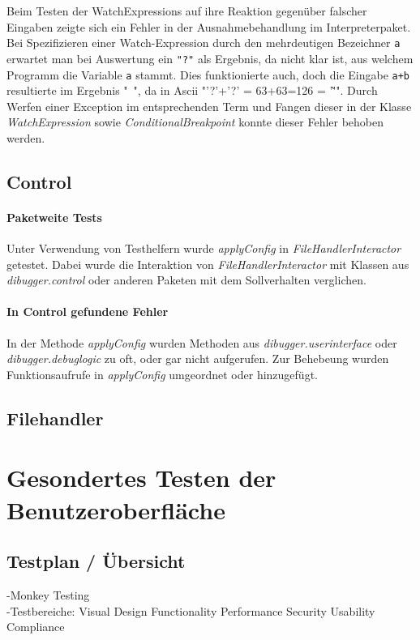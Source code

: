 \documentclass[parskip=full]{scrartcl}
\begin{document}
Beim Testen der WatchExpressions auf ihre Reaktion gegenüber falscher Eingaben zeigte sich ein Fehler in der Ausnahmebehandlung im Interpreterpaket. Bei Spezifizieren einer Watch-Expression durch den mehrdeutigen Bezeichner \texttt{a} erwartet man bei Auswertung ein \texttt{"?"} als Ergebnis, da nicht klar ist, aus welchem Programm die Variable \texttt{a} stammt. Dies funktionierte auch, doch die Eingabe \texttt{a+b} resultierte im Ergebnis "~", da in Ascii "'?'+'?' = 63+63=126 = '\~'".
Durch Werfen einer Exception im entsprechenden Term und Fangen dieser in der Klasse \textit{WatchExpression} sowie \textit{ConditionalBreakpoint} konnte dieser Fehler behoben werden.

\subsection{Control}
\paragraph{Paketweite Tests}
Unter Verwendung von Testhelfern wurde \textit{applyConfig} in \textit{FileHandlerInteractor} getestet.
Dabei wurde die Interaktion von \textit{FileHandlerInteractor} mit Klassen aus \textit{dibugger.control} oder anderen Paketen mit dem Sollverhalten verglichen.
\paragraph{In Control gefundene Fehler}
In der Methode \textit{applyConfig} wurden Methoden aus \textit{dibugger.userinterface} oder \textit{dibugger.debuglogic} zu oft, oder gar nicht aufgerufen.
Zur Behebeung wurden Funktionsaufrufe in \textit{applyConfig} umgeordnet oder hinzugefügt.
\subsection{Filehandler}

\section{Gesondertes Testen der Benutzeroberfläche}

\subsection{Testplan / Übersicht}
-Monkey Testing \\
-Testbereiche: Visual Design Functionality Performance Security Usability Compliance
\end{document}
